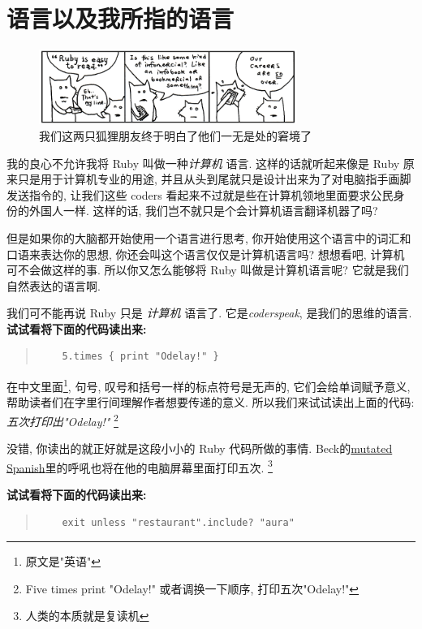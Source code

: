 \section{语言以及我所指的语言}
\begin{figure}[h]
  \centering
  \includegraphics[width=0.75\textwidth]{image/why/foxes-3.png}
  \caption{我们这两只狐狸朋友终于明白了他们一无是处的窘境了}
\end{figure}

我的良心不允许我将 Ruby 叫做一种\emph{计算机} 语言. 
这样的话就听起来像是 Ruby 原来只是用于计算机专业的用途, 
并且从头到尾就只是设计出来为了对电脑指手画脚发送指令的, 让我们这些 
coders 看起来不过就是些在计算机领地里面要求公民身份的外国人一样. 
这样的话, 我们岂不就只是个会计算机语言翻译机器了吗? 

但是如果你的大脑都开始使用一个语言进行思考, 
你开始使用这个语言中的词汇和口语来表达你的思想, 
你还会叫这个语言仅仅是计算机语言吗? 想想看吧, 计算机可不会做这样的事.
所以你又怎么能够将 Ruby 叫做是计算机语言呢? 
它就是我们自然表达的语言啊. 

我们可不能再说 Ruby 只是 \emph{计算机} 语言了. 
它是\emph{coderspeak}, 是我们的思维的语言. \\

\textbf{试试看将下面的代码读出来: }
\begin{quotation}
  \begin{verbatim}
    5.times { print "Odelay!" }
  \end{verbatim}
\end{quotation}

在中文里面\footnote{原文是"英语"}, 句号, 叹号和括号一样的标点符号是无声的, 
它们会给单词赋予意义, 帮助读者们在字里行间理解作者想要传递的意义. 
所以我们来试试读出上面的代码: \emph{五次打印出"Odelay!"}
\footnote{Five times print "Odelay!" 或者调换一下顺序, 打印五次"Odelay!"}

没错, 你读出的就正好就是这段小小的 Ruby 代码所做的事情. 
Beck的\href{http://whiskeyclone.net/ghost/songinfo.php?songID=175}{mutated Spanish}里的呼吼也将在他的电脑屏幕里面打印五次. 
\footnote{人类的本质就是复读机}

\textbf{试试看将下面的代码读出来: }
\begin{quotation}
  \begin{verbatim}
    exit unless "restaurant".include? "aura"
  \end{verbatim}
\end{quotation}

